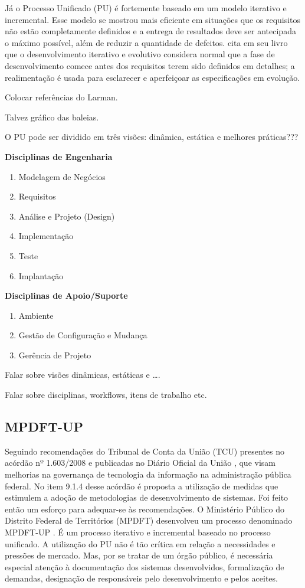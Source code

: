 \documentclass[
	article,			%
	11pt,				%
	oneside,			%
	a4paper,			%
	english,			%
	brazil,				%
	sumario=tradicional
	]{abntex2}
\begin{document}
Já o Processo Unificado (PU) \cite{jacobson1999unified} é fortemente baseado em um modelo
iterativo e incremental. Esse modelo se mostrou mais eficiente em situações que os
requisitos não estão completamente definidos e a entrega de resultados deve ser
antecipada o máximo possível, além de reduzir a quantidade de defeitos.
 cita em seu livro que o desenvolvimento
iterativo e evolutivo considera normal que a fase de desenvolvimento comece
antes dos requisitos terem sido definidos em detalhes; a realimentação é usada
para esclarecer e aperfeiçoar as especificações em evolução.

Colocar referências do Larman.

Talvez gráfico das baleias.

O PU pode ser dividido em três visões: dinâmica, estática e melhores práticas???

\textbf{Disciplinas de Engenharia}

\begin{enumerate}
   \item Modelagem de Negócios
   \item Requisitos
   \item Análise e Projeto (Design)
   \item Implementação
   \item Teste
   \item Implantação
\end{enumerate}

\textbf{Disciplinas de Apoio/Suporte}

\begin{enumerate}
   \item Ambiente
   \item Gestão de Configuração e Mudança
   \item Gerência de Projeto
\end{enumerate}

Falar sobre visões dinâmicas, estáticas e \ldots.

Falar sobre disciplinas, workflows, itens de trabalho etc.

\subsection{MPDFT-UP}

Seguindo recomendações do Tribunal de Conta da União (TCU) presentes no acórdão
nº 1.603/2008 \cite{acordao-tcu-1603-2008} e publicadas no Diário Oficial da União
\cite{dou-20080818}, que visam melhorias na governança de tecnologia da
informação na administração pública federal. No item 9.1.4 desse acórdão é
proposta a utilização de medidas que estimulem a adoção de metodologias de
desenvolvimento de sistemas. Foi feito então um esforço para adequar-se às
recomendações. O Ministério Público do Distrito Federal de Territórios (MPDFT)
desenvolveu um processo denominado MPDFT-UP \cite{mpdft-up}. É um processo
iterativo e incremental baseado no processo unificado. A utilização do PU não é
tão crítica em relação a necessidades e pressões de mercado. Mas, por se tratar
de um órgão público, é necessária especial atenção à documentação dos sistemas
desenvolvidos, formalização de demandas, designação de responsáveis pelo
desenvolvimento e pelos aceites.
\end{document}

